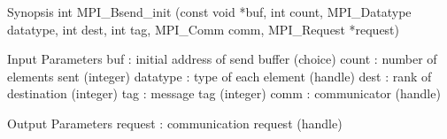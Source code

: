 Synopsis
int MPI_Bsend_init
   (const void *buf, int count, MPI_Datatype datatype,
    int dest, int tag, MPI_Comm comm, 
    MPI_Request *request)

Input Parameters
buf : initial address of send buffer (choice)
count : number of elements sent (integer)
datatype : type of each element (handle)
dest : rank of destination (integer)
tag : message tag (integer)
comm : communicator (handle)

Output Parameters
request : communication request (handle)
